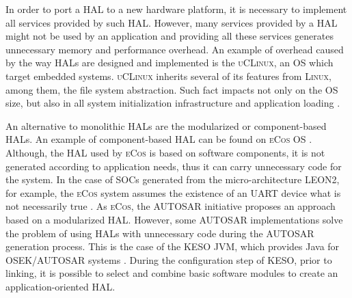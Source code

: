 In order to port a HAL to a new hardware platform,
it is necessary to implement all services provided by such HAL.
However, many services provided by a HAL might not be used by an application
and providing all these services generates unnecessary memory and performance
overhead.
% 
An example of overhead caused by the way HALs are designed and implemented is
the \textsc{uCLinux}, an OS which target embedded systems. %
\textsc{uCLinux} inherits several of its features from \textsc{Linux},
among them, the file system abstraction.
Such fact impacts not only on the OS size, but also in all system
initialization infrastructure and application loading \cite{Polpeta:2004}.

An alternative to monolithic HALs are the modularized or component-based HALs.
An example of component-based HAL can be found on \textsc{eCos} OS \cite{Massa:2002}.
Although, the HAL used by \textsc{eCos} is based on software components, it is
not generated according to application needs, thus it can carry unnecessary code
for the system.
In the case of SOCs generated from the micro-architecture LEON2, for example,
the \textsc{eCos} system assumes the existence of an UART device what is not
necessarily true \cite{Polpeta:2004}.
% 
As \textsc{eCos}, the AUTOSAR initiative \cite{AUTOSAR-site} proposes an approach based on a
modularized HAL.
However, some AUTOSAR implementations solve the problem of using HALs with
unnecessary code during the AUTOSAR generation process.
This is the case of the KESO JVM, which provides Java for OSEK/AUTOSAR systems \cite{Thomm:2010}.
During the configuration step of KESO, prior to linking, it is possible to select and
combine basic software modules to create an application-oriented HAL.

